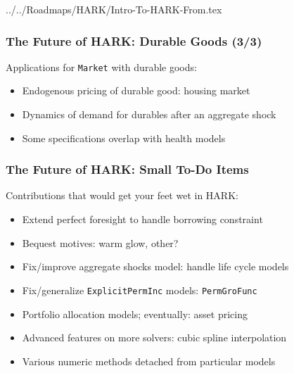 \documentclass[11ptt]{beamer}
\newcommand{\bi}{\begin{itemize}}
\newcommand{\ei}{\end{itemize}}
\begin{document}
\begin{verbatimwrite}{../../Roadmaps/HARK/Intro-To-HARK-From.tex}


  \begin{frame}
    \frametitle{The Future of HARK: Durable Goods (3/3)}
    Applications for \texttt{Market} with durable goods:
    \bi
  \item Endogenous pricing of durable good: housing market

  \item Dynamics of demand for durables after an aggregate shock

  \item Some specifications overlap with health models
    \ei

    \hyperlink{DiscussionTopics}{}
  \end{frame}



  \begin{frame}\label{StructuralChanges}
    \frametitle{The Future of HARK: Small To-Do Items}
    Contributions that would get your feet wet in HARK:
    \bi
  \item <1->Extend perfect foresight to handle borrowing constraint

  \item <1->Bequest motives: warm glow, other?

  \item <2->Fix/improve aggregate shocks model: handle life cycle models

  \item <2->Fix/generalize \texttt{ExplicitPermInc} models: \texttt{PermGroFunc}

  \item <2->Portfolio allocation models; eventually: asset pricing

  \item <3->Advanced features on more solvers: cubic spline interpolation

  \item <3->Various numeric methods detached from particular models
    \ei
  \end{frame}



\end{verbatimwrite}
\end{document}

